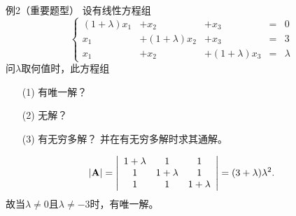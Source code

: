 \begin{frame}
  \begin{footnotesize}
    \begin{exampleblock}{例2（重要题型）}
      设有线性方程组
      $$
      \left\{
      \begin{array}{rrrcr}
        (1+\lambda)x_1&+x_2&+x_3&=&0\\[0.05in]
        x_1&+(1+\lambda)x_2&+x_3&=&3\\[0.05in]
        x_1&+x_2&+(1+\lambda)x_3&=&\lambda
      \end{array}
      \right.
      $$
      问$\lambda$取何值时，此方程组
      \begin{itemize}
      \item[(1)]有唯一解？
      \item[(2)]无解？ 
      \item[(3)]有无穷多解？ 并在有无穷多解时求其通解。
      \end{itemize}
    \end{exampleblock}
    \pause\jiename
    $$
    |\mathbf{A}|=\left|
    \begin{array}{ccc}
      1+\lambda&1&1\\
      1&1+\lambda&1\\
      1&1&1+\lambda
    \end{array}
    \right| = (3+\lambda)\lambda^2.
    $$
    故当$\lambda\ne0$且$\lambda\ne-3$时，有唯一解。
  \end{footnotesize}
\end{frame}


